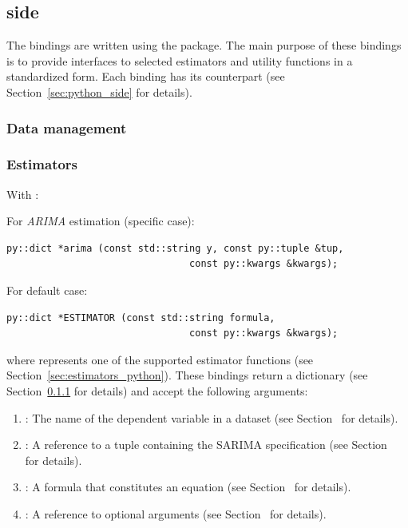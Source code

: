 \subsection[\texttt{C++} side]{ side}\label{sec:binary_bindings}
The \cpp bindings are written using the 
\citep{pybind11} package.
The main purpose of these bindings is to provide \python
interfaces to selected \lgretl estimators and utility functions
in a standardized form. Each \cpp binding has its \python
counterpart (see Section~\ref{sec:python_side} for details).


\subsubsection{Data management}\label{sec:data_management_c++}

\subsubsection{Estimators}\label{sec:estimators_c++}
With :
%

For \textit{ARIMA} estimation (specific case):
\begin{lstlisting}[style=cppstyle]
py::dict *arima (const std::string y, const py::tuple &tup,
								const py::kwargs &kwargs);
\end{lstlisting}

For default case:
\begin{lstlisting}[style=cppstyle]
py::dict *ESTIMATOR (const std::string formula,
								const py::kwargs &kwargs);
\end{lstlisting}
where  represents one of the supported
estimator functions (see Section~\ref{sec:estimators_python}).
These bindings return a \python dictionary (see
Section~\ref{sec:data_management_c++} for details) and accept
the following arguments:
\begin{enumerate}
	\item {}: The name of the dependent
		variable in a dataset (see Section~ for details).
	\item {}: A reference to a \python
		tuple containing the SARIMA specification (see Section~ for details).
	\item {}: A formula that constitutes
		an equation (see Section~ for details).
	\item {}: A reference to optional
		arguments (see Section~ for details).
\end{enumerate}
